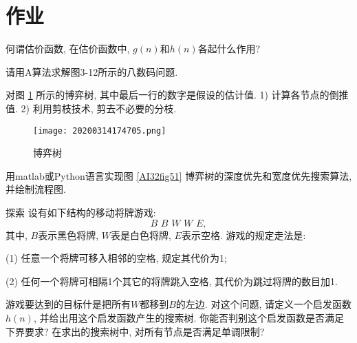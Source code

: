 \section{作业}
\begin{think}
    何谓估价函数, 在估价函数中, $g(n)$和$h(n)$各起什么作用?
\end{think}
\begin{think}
    请用A算法求解图3-12所示的八数码问题.
\end{think}
\begin{think}
    对图 \ref{20200314174705fig51} 所示的博弈树, 其中最后一行的数字是假设的估计值. 1) 计算各节点的倒推值. 2) 利用剪枝技术, 剪去不必要的分枝.
\begin{figure}[H]
    \centering
    \texttt{[image: 20200314174705.png]}
    \caption{博弈树}
    \label{20200314174705fig51}
\end{figure}
\end{think}
\begin{think}
    用matlab或Python语言实现图 \ref{AI32fig51} 博弈树的深度优先和宽度优先搜索算法, 并绘制流程图.
\end{think}
\begin{custom}[explorecolor]{探索}
设有如下结构的移动将牌游戏:$$B\,\,	B\,\,		W\,\,		W\,\,		E,$$
其中, $B$表示黑色将牌, $W$表是白色将牌, $E$表示空格. 游戏的规定走法是:

(1) 任意一个将牌可移入相邻的空格, 规定其代价为1;

(2) 任何一个将牌可相隔1个其它的将牌跳入空格, 其代价为跳过将牌的数目加1.

游戏要达到的目标什是把所有$W$都移到$B$的左边. 对这个问题, 请定义一个启发函数$h(n)$, 并给出用这个启发函数产生的搜索树.
你能否判别这个启发函数是否满足下界要求? 在求出的搜索树中, 对所有节点是否满足单调限制?
\end{custom}




